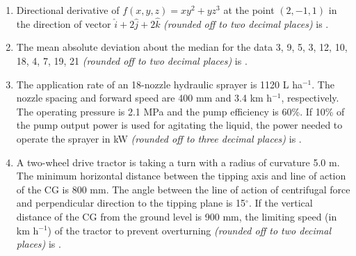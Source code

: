 \documentclass[12pt]{article}
\begin{document}
\begin{enumerate}[label =Q.\arabic*,start=26]
			Latent heat of vaporization of water at 0 $^\circ$C = 2501 kJ kg$^{-1}$ \\
			Specific heat capacity of dry air = 1.005 kJ kg$^{-1}$ K$^{-1}$ \\
			Specific heat capacity of water vapour = 1.880 kJ kg$^{-1}$ K$^{-1}$ \\
			Using above values, the dry bulb temperature and the absolute humidity of the mixed air in $^\circ$C and g water vapour (kg dry air)$^{-1}$, respectively are
			\begin{multicols}{4}
				\begin{enumerate}[label=(\Alph*)]
					\item 43 and 30
					\item 44 and 31
					\item 45 and 33
					\item 46 and 35
				\end{enumerate}
			\end{multicols}

		\item Directional derivative of $f(x,y,z) = xy^2 + yz^3$ at the point $(2, -1, 1)$ in the direction of vector $\hat{i} + 2\hat{j} + 2\hat{k}$ \textit{(rounded off to two decimal places)} is \underline{\hspace{2cm}}.

		\item The mean absolute deviation about the median for the data 3, 9, 5, 3, 12, 10, 18, 4, 7, 19, 21 \textit{(rounded off to two decimal places)} is \underline{\hspace{2cm}}.

		\item The application rate of an 18-nozzle hydraulic sprayer is 1120 L ha$^{-1}$. The nozzle spacing and forward speed are 400 mm and 3.4 km h$^{-1}$, respectively. The operating pressure is 2.1 MPa and the pump efficiency is 60\%. If 10\% of the pump output power is used for agitating the liquid, the power needed to operate the sprayer in kW \textit{(rounded off to three decimal places)} is \underline{\hspace{2cm}}.

		\item A two-wheel drive tractor is taking a turn with a radius of curvature 5.0 m. The minimum horizontal distance between the tipping axis and line of action of the CG is 800 mm. The angle between the line of action of centrifugal force and perpendicular direction to the tipping plane is 15$^\circ$. If the vertical distance of the CG from the ground level is 900 mm, the limiting speed (in km h$^{-1}$) of the tractor to prevent overturning \textit{(rounded off to two decimal places)} is \underline{\hspace{2cm}}.


\end{enumerate}
\end{document}
